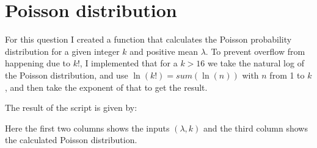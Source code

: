 \section{Poisson distribution}

For this question I created a function that calculates the Poisson probability distribution for a given integer $k$ and positive mean $\lambda$.
To prevent overflow from happening due to $k!$, I implemented that for a $k > 16$ we take the natural log of the Poisson distribution, and use $\ln(k!) = sum(\ln(n))$ with $n$ from 1 to $k$, and then take the exponent of that to get the result.



The result of the script is given by:



Here the first two columns shows the inputs $(\lambda, k)$ and the third column shows the calculated Poisson distribution.
